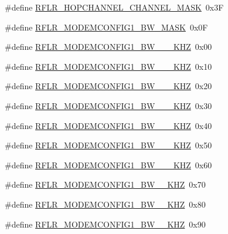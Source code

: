 \begin{DoxyCompactItemize}
\item 
\#define \hyperlink{sx1276Regs-LoRa_8h_a8f0d9adf82ac36ad0e801b0ab96439a2}{R\+F\+L\+R\+\_\+\+H\+O\+P\+C\+H\+A\+N\+N\+E\+L\+\_\+\+C\+H\+A\+N\+N\+E\+L\+\_\+\+M\+A\+SK}~0x3F
\item 
\#define \hyperlink{sx1276Regs-LoRa_8h_ab1aa24187e882f0f54896b50ccae77d4}{R\+F\+L\+R\+\_\+\+M\+O\+D\+E\+M\+C\+O\+N\+F\+I\+G1\+\_\+\+B\+W\+\_\+\+M\+A\+SK}~0x0F
\item 
\#define \hyperlink{sx1276Regs-LoRa_8h_a5588d7dec546c6f6f676ab4f7574604a}{R\+F\+L\+R\+\_\+\+M\+O\+D\+E\+M\+C\+O\+N\+F\+I\+G1\+\_\+\+B\+W\+\_\+\_\+\_\+\+K\+HZ}~0x00
\item 
\#define \hyperlink{sx1276Regs-LoRa_8h_acc64eb6597ce1a53b3150ed0e66ed5c1}{R\+F\+L\+R\+\_\+\+M\+O\+D\+E\+M\+C\+O\+N\+F\+I\+G1\+\_\+\+B\+W\+\_\+\_\+\_\+\+K\+HZ}~0x10
\item 
\#define \hyperlink{sx1276Regs-LoRa_8h_a302f1d2a8b4689aeb3f09e49d882d953}{R\+F\+L\+R\+\_\+\+M\+O\+D\+E\+M\+C\+O\+N\+F\+I\+G1\+\_\+\+B\+W\+\_\+\_\+\_\+\+K\+HZ}~0x20
\item 
\#define \hyperlink{sx1276Regs-LoRa_8h_a12c825dc67bb4487e8c3844336dfbef0}{R\+F\+L\+R\+\_\+\+M\+O\+D\+E\+M\+C\+O\+N\+F\+I\+G1\+\_\+\+B\+W\+\_\+\_\+\_\+\+K\+HZ}~0x30
\item 
\#define \hyperlink{sx1276Regs-LoRa_8h_ac09be492d1d58049e2c5cef4e99607cf}{R\+F\+L\+R\+\_\+\+M\+O\+D\+E\+M\+C\+O\+N\+F\+I\+G1\+\_\+\+B\+W\+\_\+\_\+\_\+\+K\+HZ}~0x40
\item 
\#define \hyperlink{sx1276Regs-LoRa_8h_a06e169f2f77974e5f6744d3207878895}{R\+F\+L\+R\+\_\+\+M\+O\+D\+E\+M\+C\+O\+N\+F\+I\+G1\+\_\+\+B\+W\+\_\+\_\+\_\+\+K\+HZ}~0x50
\item 
\#define \hyperlink{sx1276Regs-LoRa_8h_a6fa8fd52b3b97c984c917da3ce089bf4}{R\+F\+L\+R\+\_\+\+M\+O\+D\+E\+M\+C\+O\+N\+F\+I\+G1\+\_\+\+B\+W\+\_\+\_\+\_\+\+K\+HZ}~0x60
\item 
\#define \hyperlink{sx1276Regs-LoRa_8h_aa19a521faa54c9c8ced4d57973434b1b}{R\+F\+L\+R\+\_\+\+M\+O\+D\+E\+M\+C\+O\+N\+F\+I\+G1\+\_\+\+B\+W\+\_\+\_\+\+K\+HZ}~0x70
\item 
\#define \hyperlink{sx1276Regs-LoRa_8h_ab0f85fb037803d4312f614171ceebb45}{R\+F\+L\+R\+\_\+\+M\+O\+D\+E\+M\+C\+O\+N\+F\+I\+G1\+\_\+\+B\+W\+\_\+\_\+\+K\+HZ}~0x80
\item 
\#define \hyperlink{sx1276Regs-LoRa_8h_a9fbb21591b341afa0fce0263570d5a03}{R\+F\+L\+R\+\_\+\+M\+O\+D\+E\+M\+C\+O\+N\+F\+I\+G1\+\_\+\+B\+W\+\_\+\_\+\+K\+HZ}~0x90
\item 

\end{DoxyCompactItemize}
